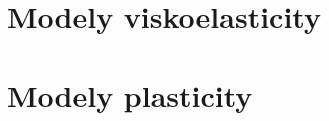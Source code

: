 \documentclass[a4paper, 10pt, oneside]{report}
\numberwithin{equation}{part}
\begin{document}
\chapter{Modely viskoelasticity}






\chapter{Modely plasticity}













\appendix

\end{document}
